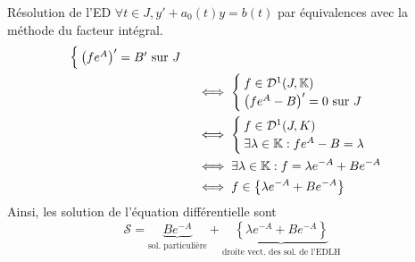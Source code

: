 \documentclass{article}
\begin{document}
\begin{question_kholle}{Résolution de l'ED  $\forall t \in J, y' + a_{0}(t)y = b(t)$ par équivalences avec la méthode du facteur intégral.}
\begin{align*}
\begin{cases}
			                                                                                                                             \left(f e^{A}\right)' = B' \text{ sur } J
		                                                                                                                             \end{cases}                                                                                                                          \\
		                                                                                                                      & \iff \begin{cases}
			                                                                                                                             f\in\mathcal{D}^1(J,\mathbb K) \\
			                                                                                                                             \left(f e^{A}-B\right)' = 0 \text{ sur } J
		                                                                                                                             \end{cases}                                                                                                                         \\
		                                                                                                                      & \iff \begin{cases}
			                                                                                                                             f\in\mathcal{D}^{1}(J,K) \\
			                                                                                                                             \exists \lambda\in\mathbb K: f e^{A}-B=\lambda
		                                                                                                                             \end{cases}                                                                                                                            \\
		                                                                                                                      & \iff \exists \lambda\in\mathbb K: f=\lambda e^{-A}+B e^{-A}                                                                                                                   \\
		                                                                                                                      & \iff f\in \left\{\lambda e^{-A}+B e^{-A}\right\}
	\end{align*}
	Ainsi, les solution de l’équation différentielle sont
	\[
		\mathcal{S}=\underbrace{B e^{-A}}_{\text{sol. particulière}} + \underbrace{\left\{\lambda e^{-A}+B e^{-A}\right\}}_{\text{droite vect. des sol. de l'EDLH}}
	\]
\end{question_kholle}
\end{document}
